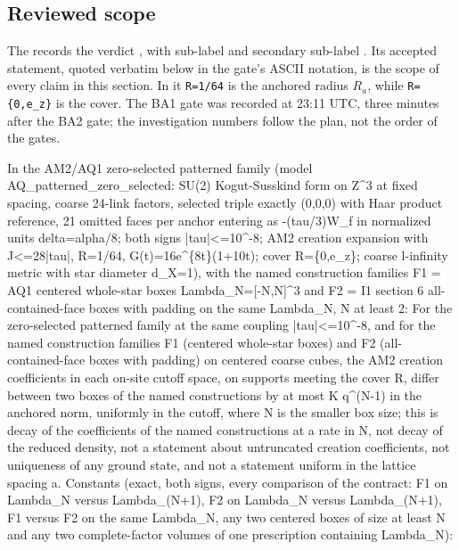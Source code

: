\subsection{Reviewed scope}
\label{sec:ba1-scope}
The  records the
verdict , with sub-label
 and secondary sub-label
. Its accepted statement, quoted verbatim below in
the gate's ASCII notation, is the scope of every claim in this section. In it
\texttt{R=1/64} is the anchored radius $R_a$, while \texttt{R=\{0,e\_z\}} is the
cover. The BA1 gate was recorded at 23:11 UTC, three minutes after the BA2
gate; the investigation numbers follow the plan, not the order of the gates.
\begin{gatequote}
In the AM2/AQ1 zero-selected patterned family (model
AQ\_patterned\_zero\_selected: SU(2) Kogut-Susskind form on
Z\textasciicircum{}3 at fixed spacing, coarse 24-link factors, selected triple
exactly (0,0,0) with Haar product reference, 21 omitted faces per anchor
entering as -(tau/3)W\_f in normalized units delta=alpha/8; both signs
|tau|<=10\textasciicircum{}-8; AM2 creation expansion with J<=28|tau|, R=1/64,
G(t)=16e\textasciicircum{}\{8t\}(1+10t); cover R=\{0,e\_z\}; coarse l-infinity
metric with star diameter d\_X=1), with the named construction families F1 =
AQ1 centered whole-star boxes Lambda\_N=[-N,N]\textasciicircum{}3 and F2 = I1
section 6 all-contained-face boxes with padding on the same Lambda\_N, N at
least 2: For the zero-selected patterned family at the same coupling
|tau|<=10\textasciicircum{}-8, and for the named construction families F1
(centered whole-star boxes) and F2 (all-contained-face boxes with padding) on
centered coarse cubes, the AM2 creation coefficients in each on-site cutoff
space, on supports meeting the cover R, differ between two boxes of the named
constructions by at most K q\textasciicircum{}(N-1) in the anchored norm,
uniformly in the cutoff, where N is the smaller box size; this is decay of the
coefficients of the named constructions at a rate in N, not decay of the
reduced density, not a statement about untruncated creation coefficients, not
uniqueness of any ground state, and not a statement uniform in the lattice
spacing a. Constants (exact, both signs, every comparison of the contract: F1
on Lambda\_N versus Lambda\_(N+1), F2 on Lambda\_N versus Lambda\_(N+1), F1
versus F2 on the same Lambda\_N, any two centered boxes of size at least N and
any two complete-factor volumes of one prescription containing Lambda\_N):

\end{gatequote}
